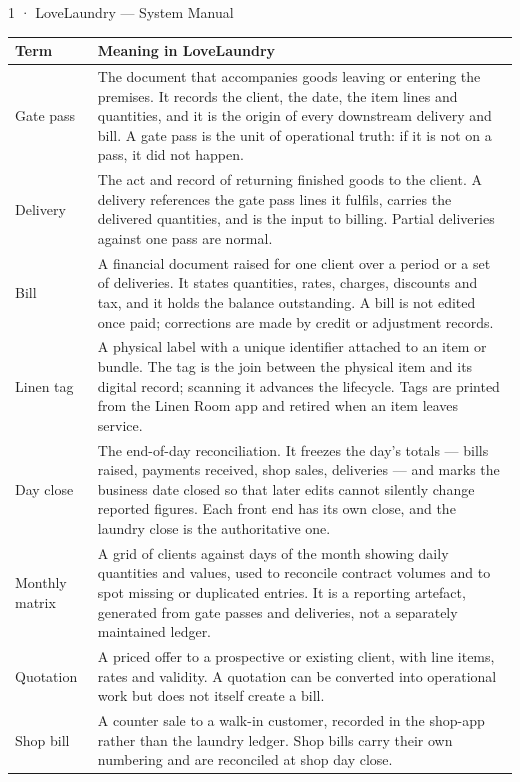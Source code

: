 \documentclass[11pt,a4paper,oneside]{book}
\begin{document}
1 · LoveLaundry — System Manual

\begin{center}\small
\begin{tabularx}{\linewidth}{|X|X|}
\hline
\rowcolor{lightgrey}
\textbf{Term} & \textbf{Meaning in LoveLaundry} \\ \hline
Gate pass & The document that accompanies goods leaving or entering the premises. It records the client, the date, the item lines and quantities, and it is the origin of every downstream delivery and bill. A gate pass is the unit of operational truth: if it is not on a pass, it did not happen. \\ \hline
Delivery & The act and record of returning finished goods to the client. A delivery references the gate pass lines it fulfils, carries the delivered quantities, and is the input to billing. Partial deliveries against one pass are normal. \\ \hline
Bill & A financial document raised for one client over a period or a set of deliveries. It states quantities, rates, charges, discounts and tax, and it holds the balance outstanding. A bill is not edited once paid; corrections are made by credit or adjustment records. \\ \hline
Linen tag & A physical label with a unique identifier attached to an item or bundle. The tag is the join between the physical item and its digital record; scanning it advances the lifecycle. Tags are printed from the Linen Room app and retired when an item leaves service. \\ \hline
Day close & The end-of-day reconciliation. It freezes the day's totals — bills raised, payments received, shop sales, deliveries — and marks the business date closed so that later edits cannot silently change reported figures. Each front end has its own close, and the laundry close is the authoritative one. \\ \hline
Monthly matrix & A grid of clients against days of the month showing daily quantities and values, used to reconcile contract volumes and to spot missing or duplicated entries. It is a reporting artefact, generated from gate passes and deliveries, not a separately maintained ledger. \\ \hline
Quotation & A priced offer to a prospective or existing client, with line items, rates and validity. A quotation can be converted into operational work but does not itself create a bill. \\ \hline
Shop bill & A counter sale to a walk-in customer, recorded in the shop-app rather than the laundry ledger. Shop bills carry their own numbering and are reconciled at shop day close. \\ \hline

\end{tabularx}
\end{center}
\end{document}
